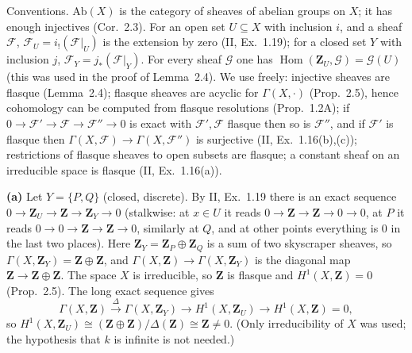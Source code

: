 \documentclass[11pt]{article}
\begin{document}
Conventions. $\mathrm{Ab}(X)$ is the category of sheaves of abelian groups on $X$; it has enough injectives (Cor.~2.3). For an open set $U\subseteq X$ with inclusion $i$, and a sheaf $\mathcal F$, $\mathcal F_U=i_!(\mathcal F|_U)$ is the extension by zero (II, Ex.~1.19); for a closed set $Y$ with inclusion $j$, $\mathcal F_Y=j_*(\mathcal F|_Y)$. For every sheaf $\mathcal G$ one has $\operatorname{Hom}(\mathbf Z_U,\mathcal G)=\mathcal G(U)$ (this was used in the proof of Lemma~2.4). We use freely: injective sheaves are flasque (Lemma~2.4); flasque sheaves are acyclic for $\Gamma(X,\cdot)$ (Prop.~2.5), hence cohomology can be computed from flasque resolutions (Prop.~1.2A); if $0\to\mathcal F'\to\mathcal F\to\mathcal F''\to0$ is exact with $\mathcal F',\mathcal F$ flasque then so is $\mathcal F''$, and if $\mathcal F'$ is flasque then $\Gamma(X,\mathcal F)\to\Gamma(X,\mathcal F'')$ is surjective (II, Ex.~1.16(b),(c)); restrictions of flasque sheaves to open subsets are flasque; a constant sheaf on an irreducible space is flasque (II, Ex.~1.16(a)).

\pf
\textbf{(a)} Let $Y=\{P,Q\}$ (closed, discrete). By II, Ex.~1.19 there is an exact sequence $0\to\mathbf Z_U\to\mathbf Z\to\mathbf Z_Y\to0$ (stalkwise: at $x\in U$ it reads $0\to\mathbf Z\to\mathbf Z\to0\to0$, at $P$ it reads $0\to0\to\mathbf Z\to\mathbf Z\to0$, similarly at $Q$, and at other points everything is $0$ in the last two places). Here $\mathbf Z_Y=\mathbf Z_P\oplus\mathbf Z_Q$ is a sum of two skyscraper sheaves, so $\Gamma(X,\mathbf Z_Y)=\mathbf Z\oplus\mathbf Z$, and $\Gamma(X,\mathbf Z)\to\Gamma(X,\mathbf Z_Y)$ is the diagonal map $\mathbf Z\to\mathbf Z\oplus\mathbf Z$. The space $X$ is irreducible, so $\mathbf Z$ is flasque and $H^1(X,\mathbf Z)=0$ (Prop.~2.5). The long exact sequence gives
\[
\Gamma(X,\mathbf Z)\xrightarrow{\ \Delta\ }\Gamma(X,\mathbf Z_Y)\to H^1(X,\mathbf Z_U)\to H^1(X,\mathbf Z)=0,
\]
so $H^1(X,\mathbf Z_U)\cong(\mathbf Z\oplus\mathbf Z)/\Delta(\mathbf Z)\cong\mathbf Z\neq0$. (Only irreducibility of $X$ was used; the hypothesis that $k$ is infinite is not needed.)
\end{document}
